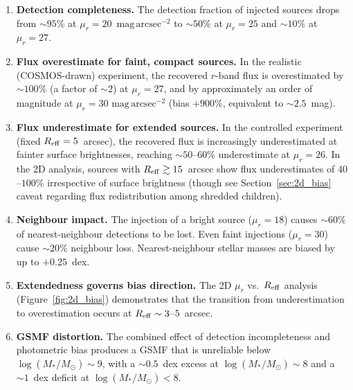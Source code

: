 \documentclass[DM,lsstdraft,authoryear,toc]{lsstdoc}
\newcommand{\mur}{\ensuremath{\mu_r}\xspace}
\newcommand{\Reff}{\ensuremath{R_{\rm eff}}\xspace}
\newcommand{\Mstar}{\ensuremath{M_*}\xspace}
\newcommand{\Msun}{\ensuremath{M_\odot}\xspace}
\begin{document}
\begin{enumerate}
  \item \textbf{Detection completeness.} The detection fraction of injected
    sources drops from ${\sim}95\%$ at $\mur = 20$~$\mathrm{mag\,arcsec^{-2}}$
    to ${\sim}50\%$ at $\mur = 25$ and ${\sim}10\%$ at $\mur = 27$.

  \item \textbf{Flux overestimate for faint, compact sources.} In the
    realistic (COSMOS-drawn) experiment, the recovered $r$-band flux is
    overestimated by ${\sim}100\%$ (a factor of ${\sim}2$) at $\mur = 27$,
    and by approximately an order of magnitude at $\mur = 30$
    $\mathrm{mag\,arcsec^{-2}}$ (bias $+900\%$, equivalent to ${\sim}2.5$~mag).

  \item \textbf{Flux underestimate for extended sources.} In the controlled
    experiment (fixed $\Reff = 5$~arcsec), the recovered flux is increasingly
    underestimated at fainter surface brightnesses, reaching ${\sim}50$--$60\%$
    underestimate at $\mur = 26$. In the 2D analysis, sources with $\Reff
    \gtrsim 15$~arcsec show flux underestimates of $40$--$100\%$ irrespective
    of surface brightness (though see Section~\ref{sec:2d_bias} caveat
    regarding flux redistribution among shredded children).

  \item \textbf{Neighbour impact.} The injection of a bright source ($\mur =
    18$) causes ${\sim}60\%$ of nearest-neighbour detections to be lost. Even
    faint injections ($\mur = 30$) cause ${\sim}20\%$ neighbour loss.
    Nearest-neighbour stellar masses are biased by up to $+0.25$~dex.

  \item \textbf{Extendedness governs bias direction.} The 2D $\mur$ vs.\
    \Reff analysis (Figure~\ref{fig:2d_bias}) demonstrates that the transition
    from underestimation to overestimation occurs at $\Reff \sim 3$--$5$~arcsec.

  \item \textbf{GSMF distortion.} The combined effect of detection
    incompleteness and photometric bias produces a GSMF that is unreliable
    below $\log(\Mstar/\Msun) \sim 9$, with a ${\sim}0.5$~dex excess at
    $\log(\Mstar/\Msun) \sim 8$ and a ${\sim}1$~dex deficit at
    $\log(\Mstar/\Msun) < 8$.


\end{enumerate}
\end{document}
